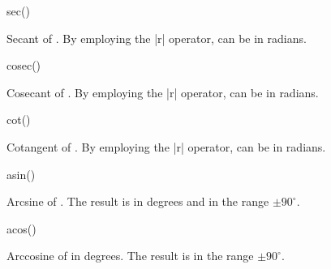 \begin{math-function}{sec()}
\mathcommand

	Secant of . By employing the |r| operator,  can be in 
	radians.

\begin{codeexample}[]
 \pgfmathresult
\end{codeexample}

\end{math-function}

\begin{math-function}{cosec()}
\mathcommand

	Cosecant of . By employing the |r| operator,  can be in 
	radians.
	
\begin{codeexample}[]
 \pgfmathresult
\end{codeexample}

\end{math-function}

\begin{math-function}{cot()}
\mathcommand

	Cotangent of . By employing the |r| operator,  can be in 
	radians.
	
\begin{codeexample}[]
 \pgfmathresult
\end{codeexample}

\end{math-function}

\begin{math-function}{asin()}
\mathcommand

	Arcsine of . The result is in degrees and in the range $\pm90^\circ$.

\begin{codeexample}[]
 \pgfmathresult
\end{codeexample}

\end{math-function}

\begin{math-function}{acos()}
\mathcommand

	Arccosine of  in degrees. The result is in the range $\pm90^\circ$.

\begin{codeexample}[]
 \pgfmathresult
\end{codeexample}

\end{math-function}

